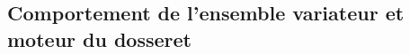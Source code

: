 \begin{multicols}{2}



%
%
%
%

\subsection*{Comportement de l'ensemble variateur et moteur du dosseret}


\end{multicols}
